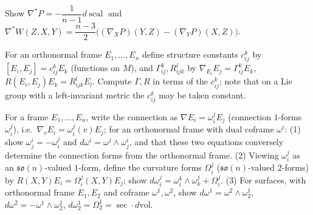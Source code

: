 \begin{remark}
  \label{rem:pet-ch3-ex-26}
  \leanok
  Show $\nabla^*P=-\dfrac1{n-1}d\operatorname{scal}$ and
  $\nabla^*W(Z,X,Y)=\dfrac{n-3}2\big((\nabla_XP)(Y,Z)-(\nabla_YP)(X,Z)\big)$.
\end{remark}

\begin{remark}
  \label{rem:pet-ch3-ex-27}
  \leanok
  For an orthonormal frame $E_1,\dots,E_n$ define structure constants $c^k_{ij}$
  by $[E_i,E_j]=c^k_{ij}E_k$ (functions on $M$), and $\Gamma^k_{ij},R^l_{ijk}$ by
  $\nabla_{E_i}E_j=\Gamma^k_{ij}E_k$, $R(E_i,E_j)E_k=R^l_{ijk}E_l$. Compute
  $\Gamma,R$ in terms of the $c^k_{ij}$; note that on a Lie group with a
  left-invariant metric the $c^k_{ij}$ may be taken constant.
\end{remark}

\begin{remark}
  \label{rem:pet-ch3-ex-28}
  \leanok
  For a frame $E_1,\dots,E_n$, write the connection as $\nabla E_i=\omega^j_iE_j$
  (connection $1$-forms $\omega^j_i$), i.e.\ $\nabla_vE_i=\omega^j_i(v)E_j$; for
  an orthonormal frame with dual coframe $\omega^i$: (1) show $\omega^i_j=-\omega^j_i$
  and $d\omega^i=\omega^j\wedge\omega^i_j$, and that these two equations
  conversely determine the connection forms from the orthonormal frame. (2)
  Viewing $\omega^j_i$ as an $\mathfrak{so}(n)$-valued $1$-form, define the
  curvature forms $\Omega^j_i$ ($\mathfrak{so}(n)$-valued $2$-forms) by
  $R(X,Y)E_i=\Omega^j_i(X,Y)E_j$; show
  $d\omega^j_i=\omega^k_i\wedge\omega^j_k+\Omega^j_i$. (3) For surfaces, with
  orthonormal frame $E_1,E_2$ and coframe $\omega^1,\omega^2$, show
  $d\omega^1=\omega^2\wedge\omega^1_2$, $d\omega^2=-\omega^1\wedge\omega^1_2$,
  $d\omega^1_2=\Omega^1_2=\sec\cdot d\mathrm{vol}$.
\end{remark}

